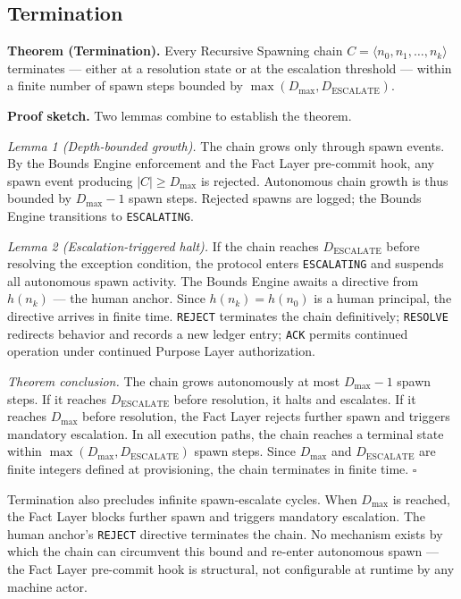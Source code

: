 \subsection{Termination}
\label{sec:rs-termination}

\noindent\textbf{Theorem (Termination).} Every Recursive Spawning chain $C = \langle n_0, n_1, \ldots, n_k \rangle$ terminates — either at a resolution state or at the escalation threshold — within a finite number of spawn steps bounded by $\max(D_{\mathrm{max}}, D_{\mathrm{ESCALATE}})$.

\medskip
\noindent\textbf{Proof sketch.} Two lemmas combine to establish the theorem.

\medskip
\textit{Lemma 1 (Depth-bounded growth).} The chain grows only through spawn events. By the Bounds Engine enforcement and the Fact Layer pre-commit hook, any spawn event producing $|C| \geq D_{\mathrm{max}}$ is rejected. Autonomous chain growth is thus bounded by $D_{\mathrm{max}} - 1$ spawn steps. Rejected spawns are logged; the Bounds Engine transitions to \texttt{ESCALATING}.

\medskip
\textit{Lemma 2 (Escalation-triggered halt).} If the chain reaches $D_{\mathrm{ESCALATE}}$ before resolving the exception condition, the protocol enters \texttt{ESCALATING} and suspends all autonomous spawn activity. The Bounds Engine awaits a directive from $h(n_k)$ — the human anchor. Since $h(n_k) = h(n_0)$ is a human principal, the directive arrives in finite time. \texttt{REJECT} terminates the chain definitively; \texttt{RESOLVE} redirects behavior and records a new ledger entry; \texttt{ACK} permits continued operation under continued Purpose Layer authorization.

\medskip
\textit{Theorem conclusion.} The chain grows autonomously at most $D_{\mathrm{max}} - 1$ spawn steps. If it reaches $D_{\mathrm{ESCALATE}}$ before resolution, it halts and escalates. If it reaches $D_{\mathrm{max}}$ before resolution, the Fact Layer rejects further spawn and triggers mandatory escalation. In all execution paths, the chain reaches a terminal state within $\max(D_{\mathrm{max}}, D_{\mathrm{ESCALATE}})$ spawn steps. Since $D_{\mathrm{max}}$ and $D_{\mathrm{ESCALATE}}$ are finite integers defined at provisioning, the chain terminates in finite time. $\square$

Termination also precludes infinite spawn-escalate cycles. When $D_{\mathrm{max}}$ is reached, the Fact Layer blocks further spawn and triggers mandatory escalation. The human anchor's \texttt{REJECT} directive terminates the chain. No mechanism exists by which the chain can circumvent this bound and re-enter autonomous spawn — the Fact Layer pre-commit hook is structural, not configurable at runtime by any machine actor.


